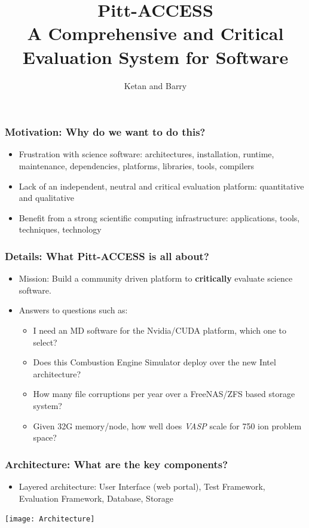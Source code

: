 \documentclass[hyperref={pdfpagelabels=false},12pt]{beamer}
\title[Pitt Access]{{\large Pitt-ACCESS\\ A Comprehensive and Critical Evaluation System for Software}}
\author[Pitt-Access]{{Ketan and Barry}}
\date{}
\begin{document}
\begin{frame}[plain]
\titlepage
\end{frame}

\begin{frame}
\frametitle{Motivation: Why do we want to do this?}
\begin{itemize}
\itemsep1em
\item 
Frustration with science software: architectures, installation, runtime, maintenance, dependencies, platforms, libraries, tools, compilers
\item 
Lack of an independent, neutral and critical evaluation platform: quantitative and qualitative
\item 
Benefit from a strong scientific computing infrastructure: applications, tools, techniques, technology
\end{itemize}
\end{frame}

\begin{frame}
\frametitle{Details: What Pitt-ACCESS is all about?}
\begin{itemize}
\itemsep1em
\item 
Mission: Build a community driven platform to \textbf{critically} evaluate science software.
\item 
Answers to questions such as:
\begin{itemize}
\item 
I need an MD software for the Nvidia/CUDA platform, which one to select?
\item 
Does this Combustion Engine Simulator deploy over the new Intel architecture?
\item
How many file corruptions per year over a FreeNAS/ZFS based storage system?
\item 
Given 32G memory/node, how well does \textit{VASP} scale for 750 ion problem space?
\end{itemize}
\end{itemize}

\end{frame}

\begin{frame}
\frametitle{Architecture: What are the key components?}
\begin{itemize}
\item 
Layered architecture: User Interface (web portal), Test Framework, Evaluation Framework, Database, Storage
\end{itemize}
\texttt{[image: Architecture]}
\end{frame}
\end{document}
